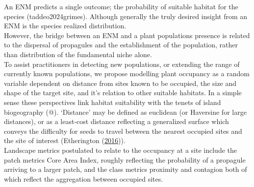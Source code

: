 \documentclass[
]{article}
\begin{document}
An ENM predicts a single outcome; the probability of suitable habitat
for the species (taddeo2024grimes). Although generally the truly desired
insight from an ENM is the species realized distribution.\\
However, the bridge between an ENM and a plant populations presence is
related to the dispersal of propagules and the establishment of the
population, rather than distribution of the fundamental niche alone.\\
To assist practitioners in detecting new populations, or extending the
range of currently known populations, we propose modelling plant
occupancy as a random variable dependent on distance from sites known to
be occupied, the size and shape of the target site, and it's relation to
other suitable habitats. In a simple sense these perspectives link
habitat suitability with the tenets of island biogeography (@).
`Distance' may be defined as euclidean (or Haversine for large
distances), or as a least-cost distance reflecting a generalized surface
which conveys the difficulty for seeds to travel between the nearest
occupied sites and the site of interest (Etherington
(\protect\hyperlink{ref-etherington2016least}{2016})).\\
Landscape metrics postulated to relate to the occupancy at a site
include the patch metrics Core Area Index, roughly reflecting the
probability of a propagule arriving to a larger patch, and the class
metrics proximity and contagion both of which reflect the aggregation
between occupied sites.
\end{document}
